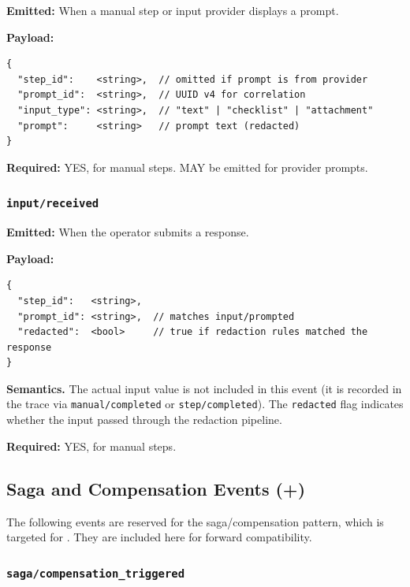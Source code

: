 \textbf{Emitted:} When a manual step or input provider displays a prompt.

\textbf{Payload:}
\begin{verbatim}
{
  "step_id":    <string>,  // omitted if prompt is from provider
  "prompt_id":  <string>,  // UUID v4 for correlation
  "input_type": <string>,  // "text" | "checklist" | "attachment"
  "prompt":     <string>   // prompt text (redacted)
}
\end{verbatim}

\textbf{Required:} YES, for manual steps. MAY be emitted for provider prompts.


\subsubsection{\texttt{input/received}}

\textbf{Emitted:} When the operator submits a response.

\textbf{Payload:}
\begin{verbatim}
{
  "step_id":   <string>,
  "prompt_id": <string>,  // matches input/prompted
  "redacted":  <bool>     // true if redaction rules matched the response
}
\end{verbatim}

\textbf{Semantics.} The actual input value is not included in this event (it is recorded in the trace via \texttt{manual/completed} or \texttt{step/completed}). The \texttt{redacted} flag indicates whether the input passed through the redaction pipeline.

\textbf{Required:} YES, for manual steps.


\subsection{Saga and Compensation Events (+)}

The following events are reserved for the saga/compensation pattern, which is targeted for . They are included here for forward compatibility.

\subsubsection{\texttt{saga/compensation\_triggered}}

